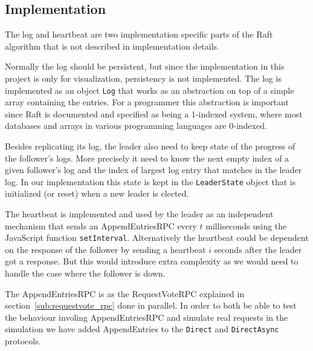 \subsection{Implementation} %
\label{sub:log_replication_implementation}

The log and heartbeat are two implementation specific parts of the Raft algorithm that is not described in implementation details.

Normally the log should be persistent, but since the implementation in this project is only for visualization, persistency is not implemented. The log is implemented as an object \verb$Log$ that works as an abstraction on top of a simple array containing the entries. For a programmer this abstraction is important since Raft is documented and specified as being a 1-indexed system, where most databases and arrays in various programming languages are 0-indexed.

Besides replicating its log, the leader also need to keep state of the progress of the follower's logs. More precisely it need to know the next empty index of a given follower's log and the index of largest log entry that matches in the leader log. In our implementation this state is kept in the \verb$LeaderState$ object that is initialized (or reset) when a new leader is elected.

The heartbeat is implemented and used by the leader as an independent mechanism that sends an AppendEntriesRPC every $t$ milliseconds using the JavaScript function \verb$setInterval$. Alternatively the heartbeat could be dependent on the response of the follower by sending a heartbeat $i$ seconds after the leader got a response. But this would introduce extra complexity as we would need to handle the case where the follower is down.

The AppendEntriesRPC is as the RequestVoteRPC explained in section~\ref{sub:requestvote_rpc} done in parallel. In order to both be able to test the behaviour involing AppendEntriesRPC and simulate real requests in the simulation we have added AppendEntries to the \verb$Direct$ and \verb$DirectAsync$ protocols.


